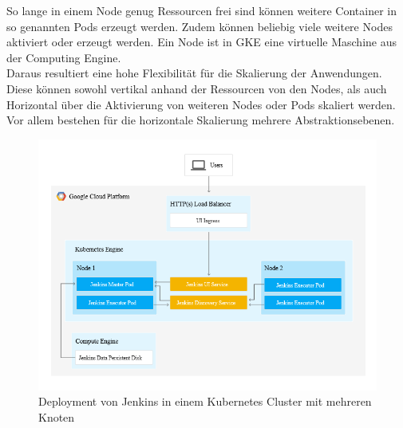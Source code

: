 So lange in einem Node genug Ressourcen frei sind können weitere Container in so genannten Pods erzeugt werden. Zudem können beliebig viele weitere Nodes aktiviert oder erzeugt werden. Ein Node ist in \ac{GKE} eine virtuelle Maschine aus der Computing Engine.
\medskip
\\
Daraus resultiert eine hohe Flexibilität für die Skalierung der Anwendungen. Diese können sowohl vertikal anhand der Ressourcen von den Nodes, als auch Horizontal über die Aktivierung von weiteren Nodes oder Pods skaliert werden. Vor allem bestehen für die horizontale Skalierung mehrere Abstraktionsebenen.

\begin{figure}[htbp]
 \centering
 \includegraphics[width=1.0\textwidth]{gfx/jenkins-kubernetes-architecture.png}
 \caption{Deployment von Jenkins in einem Kubernetes Cluster mit mehreren Knoten \cite{Google:GKEJenkins}\label{fig:gkejenkins}}
\end{figure}